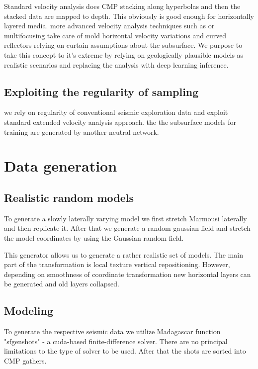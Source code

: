 \documentclass[paper,twocolomn]{geophysics}
\begin{document}
Standard velocity analysis does CMP stacking along hyperbolas and then the stacked data are mapped to depth. This obviously is good enough for horizontally layered media. more advanced velocity analysis techniques such as  or multifocusing take care of mold horizontal velocity variations and curved reflectors relying on curtain assumptions about the subsurface. We purpose to take this concept to it's extreme by relying on geologically plausible models as realistic scenarios and replacing the analysis with deep learning inference.

\subsection{Exploiting the regularity of sampling}
we rely on regularity of conventional seismic exploration data and exploit standard extended velocity analysis approach.  the
the subsurface models for training are generated by another neutral network.


\section{Data generation}

\subsection{Realistic random models}
To generate a slowly laterally varying model we first stretch Marmousi laterally and then replicate it.
% 
After that we generate a random gaussian field and stretch the model coordinates by using the Gaussian random field.

This generator allows us to generate a rather realistic set of models. The main part of the transformation is local texture vertical repositioning. However, depending on smoothness of coordinate transformation new horizontal layers can be generated and old layers collapsed.

\subsection{Modeling}
To generate the respective seismic data we utilize Madagascar function "sfgenshots" - a cuda-based finite-difference solver. There are no principal limitations to the type of solver to be used. After that the shots are sorted into CMP gathers.
\end{document}
